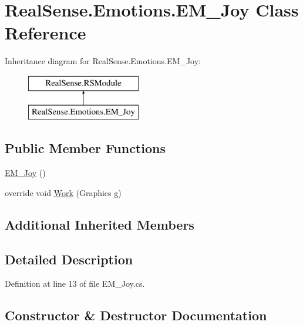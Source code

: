 \hypertarget{class_real_sense_1_1_emotions_1_1_e_m___joy}{}\section{Real\+Sense.\+Emotions.\+E\+M\+\_\+\+Joy Class Reference}
\label{class_real_sense_1_1_emotions_1_1_e_m___joy}
Inheritance diagram for Real\+Sense.\+Emotions.\+E\+M\+\_\+\+Joy\+:\begin{figure}[H]
\begin{center}
\leavevmode
\includegraphics[height=2.000000cm]{class_real_sense_1_1_emotions_1_1_e_m___joy}
\end{center}
\end{figure}
\subsection*{Public Member Functions}
\begin{DoxyCompactItemize}
\item 
\hyperlink{class_real_sense_1_1_emotions_1_1_e_m___joy_a1e37185e1aadd7a6e9c38414b5eb22fe}{E\+M\+\_\+\+Joy} ()
\item 
override void \hyperlink{class_real_sense_1_1_emotions_1_1_e_m___joy_acce5a4daa0acfd1a10d0aac92ef278c8}{Work} (Graphics g)
\end{DoxyCompactItemize}
\subsection*{Additional Inherited Members}


\subsection{Detailed Description}


Definition at line 13 of file E\+M\+\_\+\+Joy.\+cs.



\subsection{Constructor \& Destructor Documentation}
\mbox{\label{class_real_sense_1_1_emotions_1_1_e_m___joy_a1e37185e1aadd7a6e9c38414b5eb22fe}} 
